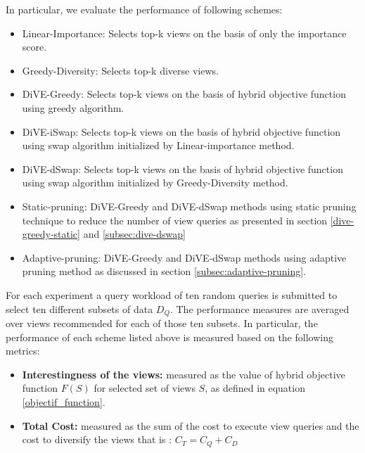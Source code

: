 In particular, we evaluate the performance of following schemes:
\begin{itemize}
	\item Linear-Importance: Selects top-k views on the basis of only the importance score.
	\item Greedy-Diversity: Selects top-k diverse views.
	\item DiVE-Greedy: Selects top-k views on the basis of hybrid objective function using greedy algorithm.
	\item DiVE-iSwap: Selects top-k views on the basis of hybrid objective function using swap algorithm initialized by Linear-importance method. 
	\item DiVE-dSwap: Selects top-k views on the basis of hybrid objective function using swap algorithm initialized by Greedy-Diversity method.
	\item Static-pruning: DiVE-Greedy and DiVE-dSwap methods using static pruning technique to reduce the number of view queries as presented in section \ref{dive-greedy-static}  and \ref{subsec:dive-dswap}
	\item Adaptive-pruning: DiVE-Greedy and DiVE-dSwap methods using adaptive pruning method as discussed in section \ref{subsec:adaptive-pruning}.	
\end{itemize}
For each experiment a query workload of ten random queries is submitted to select ten different subsets of data $D_Q$. The performance measures are averaged over views recommended for each of those ten subsets. In particular, the performance of each scheme listed above is measured based on the following metrics:
\begin{itemize}
	\item {\bf  Interestingness of the views:} measured as the value of hybrid objective function 
	$F\left(S\right)$ for selected set of views $S$, as defined in equation \ref{objectif_function}.
	\item {\bf Total Cost:} measured as the sum of the cost to execute view queries and the cost to diversify the views that is : $C_T= C_Q + C_D$
\end{itemize}

